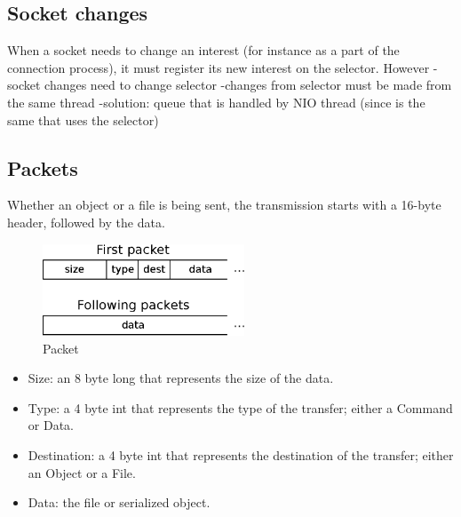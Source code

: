 \documentclass[11pt]{article}
\begin{document}
\subsection{Socket changes}
	When a socket needs to change an interest (for instance as a part of the connection process), it must register its new interest on the selector. However 
	-socket changes need to change selector
	-changes from selector must be made from the same thread
	-solution: queue that is handled by NIO thread (since is the same that uses the selector)
\subsection{Packets}
	Whether an object or a file is being sent, the transmission starts with a 16-byte header, followed by the data.
	\begin{figure}[H]
	\centering
	\includegraphics[width=60mm]{img/drawing4.eps}
	\caption[Packet]{Packet}
	\label{drawing4}
	\end{figure}
	\begin{itemize}
		\item Size: an 8 byte long that represents the size of the data.
		\item Type: a 4 byte int that represents the type of the transfer; either a Command or Data.
		\item Destination: a 4 byte int that represents the destination of the transfer; either an Object or a File.
		\item Data: the file or serialized object.
	\end{itemize}
\end{document}
